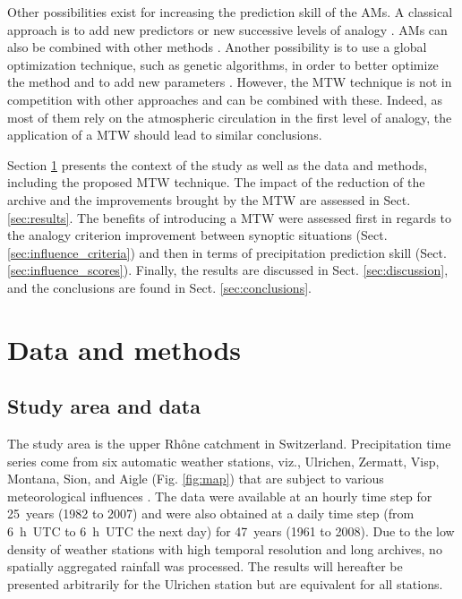 \documentclass[hess, manuscript]{copernicus}
\begin{document}
	Other possibilities exist for increasing the prediction skill of the AMs. A classical approach is to add new predictors or new successive levels of analogy \citep[see e.g.][]{Horton2012a, BenDaoud2016, Caillouet2016}. AMs can also be combined with other methods \citep[see e.g.][]{Chardon2014}. Another possibility is to use a global optimization technique, such as genetic algorithms, in order to better optimize the method and to add new parameters \citep{Horton2016}. However, the MTW technique is not in competition with other approaches and can be combined with these. Indeed, as most of them rely on the atmospheric circulation in the first level of analogy, the application of a MTW should lead to similar conclusions.
	
	Section \ref{sec:data_methods} presents the context of the study as well as the data and methods, including the proposed MTW technique. The impact of the reduction of the archive and the improvements brought by the MTW are assessed in Sect. \ref{sec:results}. The benefits of introducing a MTW were assessed first in regards to the analogy criterion improvement between synoptic situations (Sect. \ref{sec:influence_criteria}) and then in terms of precipitation prediction skill (Sect. \ref{sec:influence_scores}). Finally, the results are discussed in Sect. \ref{sec:discussion}, and the conclusions are found in Sect. \ref{sec:conclusions}.
	
	
	\section{Data and methods}
	\label{sec:data_methods}
	
	\subsection{Study area and data}
	\label{sec:data}
	
	The study area is the upper Rh\^{o}ne catchment in Switzerland. Precipitation time series come from six automatic weather stations, viz., Ulrichen, Zermatt, Visp, Montana, Sion, and Aigle (Fig. \ref{fig:map}) that are subject to various meteorological influences \citep{Horton2012}. The data were available at an hourly time step for 25~years (1982 to 2007) and were also obtained at a daily time step (from 6~h~UTC to 6~h~UTC the next day) for 47~years (1961 to 2008). Due to the low density of weather stations with high temporal resolution and long archives, no spatially aggregated rainfall was processed. The results will hereafter be presented arbitrarily for the Ulrichen station but are equivalent for all stations.
	
\end{document}
